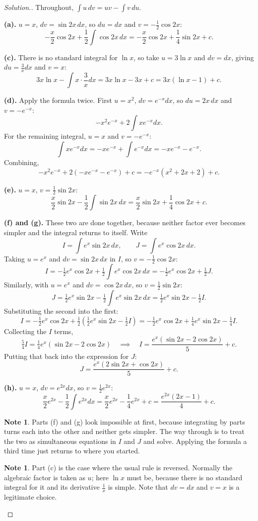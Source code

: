 \documentclass[11pt,a4paper]{article}
\theoremstyle{definition}
\newtheorem{note}[thm]{Note}
\newenvironment{solution}
  {\renewcommand{\qedsymbol}{}\begin{proof}[\textit{Solution}.]}
  {\end{proof}}
\begin{document}
\begin{solution}
Throughout, $\int u\,dv=uv-\int v\,du$.

\textbf{(a).} $u=x$, $dv=\sin 2x\,dx$, so $du=dx$ and $v=-\frac{1}{2}\cos 2x$:
$$-\frac{x}{2}\cos 2x+\frac{1}{2}\int\cos 2x\,dx
=-\frac{x}{2}\cos 2x+\frac{1}{4}\sin 2x+c.$$

\textbf{(c).} There is no standard integral for $\ln x$, so take $u=3\ln x$ and
$dv=dx$, giving $du=\frac{3}{x}dx$ and $v=x$:
$$3x\ln x-\int x\cdot\frac{3}{x}dx=3x\ln x-3x+c=3x(\ln x-1)+c.$$

\textbf{(d).} Apply the formula twice. First $u=x^2$, $dv=e^{-x}dx$, so $du=2x\,dx$ and
$v=-e^{-x}$:
$$-x^2e^{-x}+2\int xe^{-x}dx.$$
For the remaining integral, $u=x$ and $v=-e^{-x}$:
$$\int xe^{-x}dx=-xe^{-x}+\int e^{-x}dx=-xe^{-x}-e^{-x}.$$
Combining,
$$-x^2e^{-x}+2\left(-xe^{-x}-e^{-x}\right)+c=-e^{-x}\left(x^2+2x+2\right)+c.$$

\textbf{(e).} $u=x$, $v=\frac{1}{2}\sin 2x$:
$$\frac{x}{2}\sin 2x-\frac{1}{2}\int\sin 2x\,dx=\frac{x}{2}\sin 2x+\frac{1}{4}\cos 2x+c.$$

\textbf{(f) and (g).} These two are done together, because neither factor ever becomes
simpler and the integral returns to itself. Write
$$I=\int e^x\sin 2x\,dx,\qquad J=\int e^x\cos 2x\,dx.$$
Taking $u=e^x$ and $dv=\sin 2x\,dx$ in $I$, so $v=-\frac{1}{2}\cos 2x$:
$$I=-\tfrac{1}{2}e^x\cos 2x+\tfrac{1}{2}\int e^x\cos 2x\,dx
=-\tfrac{1}{2}e^x\cos 2x+\tfrac{1}{2}J.$$
Similarly, with $u=e^x$ and $dv=\cos 2x\,dx$, so $v=\frac{1}{2}\sin 2x$:
$$J=\tfrac{1}{2}e^x\sin 2x-\tfrac{1}{2}\int e^x\sin 2x\,dx
=\tfrac{1}{2}e^x\sin 2x-\tfrac{1}{2}I.$$
Substituting the second into the first:
$$I=-\tfrac{1}{2}e^x\cos 2x+\tfrac{1}{2}\left(\tfrac{1}{2}e^x\sin 2x
-\tfrac{1}{2}I\right)=-\tfrac{1}{2}e^x\cos 2x+\tfrac{1}{4}e^x\sin 2x-\tfrac{1}{4}I.$$
Collecting the $I$ terms,
$$\tfrac{5}{4}I=\tfrac{1}{4}e^x\left(\sin 2x-2\cos 2x\right)\quad\implies\quad
I=\frac{e^x\left(\sin 2x-2\cos 2x\right)}{5}+c.$$
Putting that back into the expression for $J$:
$$J=\frac{e^x\left(2\sin 2x+\cos 2x\right)}{5}+c.$$

\textbf{(h).} $u=x$, $dv=e^{2x}dx$, so $v=\frac{1}{2}e^{2x}$:
$$\frac{x}{2}e^{2x}-\frac{1}{2}\int e^{2x}dx=\frac{x}{2}e^{2x}-\frac{1}{4}e^{2x}+c
=\frac{e^{2x}(2x-1)}{4}+c.$$

\begin{note}
Parts (f) and (g) look impossible at first, because integrating by parts turns each into
the other and neither gets simpler. The way through is to treat the two as simultaneous
equations in $I$ and $J$ and solve. Applying the formula a third time just returns to
where you started.
\end{note}

\begin{note}
Part (c) is the case where the usual rule is reversed. Normally the algebraic factor is
taken as $u$; here $\ln x$ must be, because there is no standard integral for it and its
derivative $\frac{1}{x}$ is simple. Note that $dv=dx$ and $v=x$ is a legitimate choice.
\end{note}
\end{solution}
\end{document}
